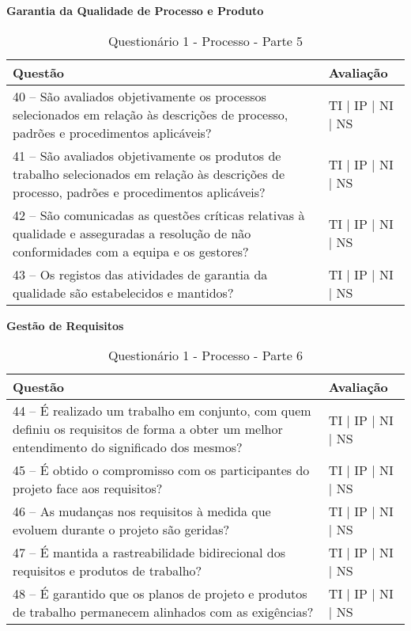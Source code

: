 \documentclass[openany,10pt,a4paper]{article}
\begin{document}
\begin{longtable}
\begin{appendix}
\begin{table}[h]
\textbf{Garantia da Qualidade de Processo e Produto}
	\centering
	\caption{Questionário 1 - Processo - Parte 5}
	\begin{tabular}{p{3.5in}p{2in}}		
		\toprule
		\textbf{Questão}  & \textbf{Avaliação}\\ 
		\midrule
		40 – São avaliados objetivamente os processos selecionados em relação às descrições de 
processo, padrões e procedimentos aplicáveis?
 & TI | IP | NI | NS \\
        \midrule
		41 – São avaliados objetivamente os produtos de trabalho selecionados em relação às descrições 
de processo, padrões e procedimentos aplicáveis?
 & TI | IP | NI | NS \\
		\midrule
		42 – São comunicadas as questões críticas relativas à qualidade e asseguradas a resolução de 
não conformidades com a equipa e os gestores?
 & TI | IP | NI | NS \\
		\midrule
        43 – Os registos das atividades de garantia da qualidade são estabelecidos e mantidos?
 & TI | IP | NI | NS \\
		\bottomrule
	\end{tabular} 
	\label{tab:tabela1}
\end{table}

\begin{table}[h]
\textbf{Gestão de Requisitos}
	\centering
	\caption{Questionário 1 - Processo - Parte 6}
	\begin{tabular}{p{3.5in}p{2in}}		
		\toprule
		\textbf{Questão}  & \textbf{Avaliação}\\ 
		\midrule
		44 – É realizado um trabalho em conjunto, com quem definiu os requisitos de forma a obter um 
melhor entendimento do significado dos mesmos?
 & TI | IP | NI | NS \\
        \midrule
		45 – É obtido o compromisso com os participantes do projeto face aos requisitos?
 & TI | IP | NI | NS \\
		\midrule
		46 – As mudanças nos requisitos à medida que evoluem durante o projeto são geridas?
 & TI | IP | NI | NS \\
		\midrule
        47 – É mantida a rastreabilidade bidirecional dos requisitos e produtos de trabalho?
 & TI | IP | NI | NS \\
		\midrule
		48 – É garantido que os planos de projeto e produtos de trabalho permanecem alinhados com 
as exigências?
  & TI | IP | NI | NS \\
		\bottomrule
	\end{tabular} 
	\label{tab:tabela1}
\end{table}


\end{appendix}
\end{longtable}
\end{document}
